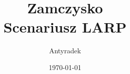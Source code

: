 \documentclass[a4paper,10pt]{article}
\begin{document}
	\title{Zamczysko\\{\small{Scenariusz LARP}}}
	\author{Antyradek}
	\date{\today}
	\maketitle
	
\end{document}
